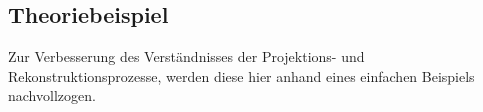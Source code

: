 \documentclass[slug=PET, room=Andreas-Schubert-Bau\,\ 424A,
supervisor=Carsten\ Bittrich, coursedate=10.\ 01.\ 2020, ngerman]{../../Lab_Report_LaTeX/lab_report}
\begin{document}


\subsection{Theoriebeispiel}
\label{sec:theobei}
Zur Verbesserung des Verst\"andnisses der Projektions- und
Rekonstruktionsprozesse, werden diese hier anhand eines einfachen
Beispiels nachvollzogen.
\end{document}
